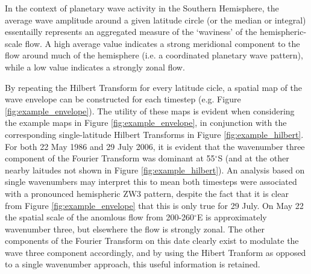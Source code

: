 In the context of planetary wave activity in the Southern Hemisphere, the average wave amplitude around a given latitude circle (or the median or integral) essentailly represents an aggregated measure of the `waviness' of the hemispheric-scale flow. A high average value indicates a strong meridional component to the flow around much of the hemisphere (i.e. a coordinated planetary wave pattern), while a low value indicates a strongly zonal flow. 

By repeating the Hilbert Transform for every latitude cicle, a spatial map of the wave envelope can be constructed for each timestep (e.g. Figure \ref{fig:example_envelope}). The utility of these maps is evident when considering the example maps in Figure \ref{fig:example_envelope}, in conjunction with the corresponding single-latitude Hilbert Transforms in Figure \ref{fig:example_hilbert}. For both 22 May 1986 and 29 July 2006, it is evident that the wavenumber three component of the Fourier Transform was dominant at 55$^{\circ}$S (and at the other nearby laitudes not shown in Figure \ref{fig:example_hilbert}). An analysis based on single wavenumbers may interpret this to mean both timesteps were associated with a pronounced hemispheric ZW3 pattern, despite the fact that it is clear from Figure \ref{fig:example_envelope} that this is only true for 29 July. On May 22 the spatial scale of the anomlous flow from 200-260$^{\circ}$E is approximately wavenumber three, but elsewhere the flow is strongly zonal. The other components of the Fourier Transform on this date clearly exist to modulate the wave three component accordingly, and by using the Hibert Tranform as opposed to a single wavenumber approach, this useful information is retained.
